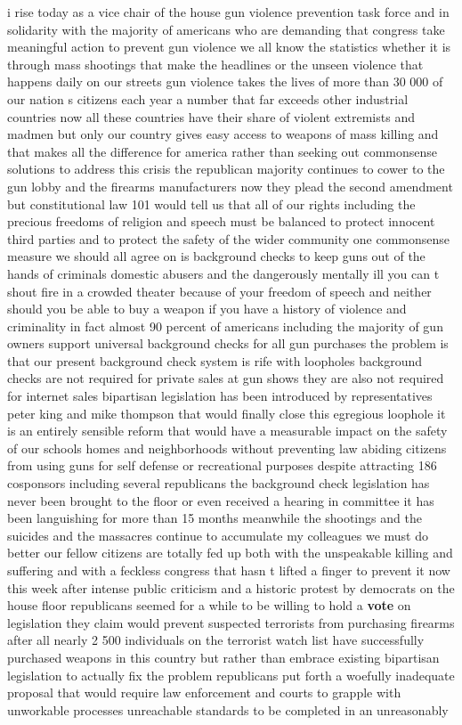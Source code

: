 \documentclass{article}
\begin{document}
\vspace{8mm}
i rise today as a vice chair of the house gun violence prevention task force and in solidarity with the majority of americans who are demanding that congress take meaningful action to prevent gun violence we all know the statistics whether it is through mass shootings that make the headlines or the unseen violence that happens daily on our streets gun violence takes the lives of more than 30 000 of our nation s citizens each year a number that far exceeds other industrial countries now all these countries have their share of violent extremists and madmen but only our country gives easy access to weapons of mass killing and that makes all the difference for america rather than seeking out commonsense solutions to address this crisis the republican majority continues to cower to the gun lobby and the firearms manufacturers now they plead the second amendment but constitutional law 101 would tell us that all of our rights including the precious freedoms of religion and speech must be balanced to protect innocent third parties and to protect the safety of the wider community one commonsense measure we should all agree on is background checks to keep guns out of the hands of criminals domestic abusers and the dangerously mentally ill you can t shout fire in a crowded theater because of your freedom of speech and neither should you be able to buy a weapon if you have a history of violence and criminality in fact almost 90 percent of americans including the majority of gun owners support universal background checks for all gun purchases the problem is that our present background check system is rife with loopholes background checks are not required for private sales at gun shows they are also not required for internet sales bipartisan legislation has been introduced by representatives peter king and mike thompson that would finally close this egregious loophole it is an entirely sensible reform that would have a measurable impact on the safety of our schools homes and neighborhoods without preventing law abiding citizens from using guns for self defense or recreational purposes despite attracting 186 cosponsors including several republicans the background check legislation has never been brought to the floor or even received a hearing in committee it has been languishing for more than 15 months meanwhile the shootings and the suicides and the massacres continue to accumulate my colleagues we must do better our fellow citizens are totally fed up both with the unspeakable killing and suffering and with a feckless congress that hasn t lifted a finger to prevent it now this week after intense public criticism and a historic protest by democrats on the house floor republicans seemed for a while to be willing to hold a {\bf \color{red} vote} on legislation they claim would prevent suspected terrorists from purchasing firearms after all nearly 2 500 individuals on the terrorist watch list have successfully purchased weapons in this country but rather than embrace existing bipartisan legislation to actually fix the problem republicans put forth a woefully inadequate proposal that would require law enforcement and courts to grapple with unworkable processes unreachable standards to be completed in an unreasonably 
\end{document}
